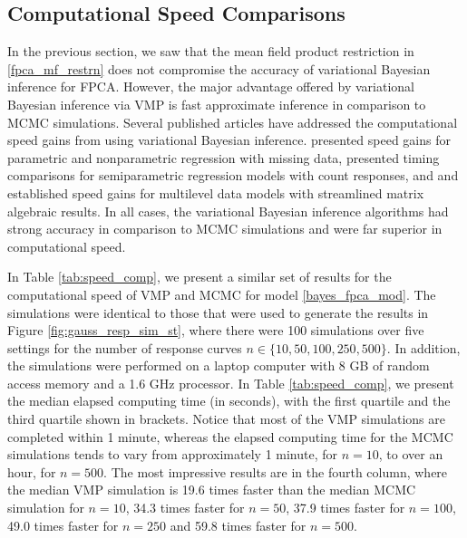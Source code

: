 \documentclass[ba]{imsart}
\numberwithin{equation}{section}
\theoremstyle{plain}
\begin{document}

\subsection{Computational Speed Comparisons}
\label{sec:speed_comp}

In the previous section, we saw that the mean field product restriction in \eqref{fpca_mf_restrn} does not
compromise the accuracy of variational Bayesian inference for FPCA. However,
the major advantage offered by variational Bayesian inference via VMP is fast approximate inference in 
comparison to MCMC simulations. Several published articles have addressed the computational speed gains
from using variational Bayesian inference. \citet{faes11} presented speed gains for parametric and nonparametric
regression with missing data, \citet{luts15} presented timing comparisons for semiparametric regression
models with count responses, and
\citet{lee16} and \citet{nolanmw20} established speed gains for multilevel data models
with streamlined matrix algebraic results.
In all cases, the variational Bayesian inference algorithms had strong accuracy in
comparison to MCMC simulations and were far superior in computational speed.

In Table \ref{tab:speed_comp}, we present a similar set of results for the computational speed of VMP and MCMC
for model \eqref{bayes_fpca_mod}. The simulations were identical to those that were used to generate the
results in Figure \ref{fig:gauss_resp_sim_st}, where there were 100 simulations over five settings for the number
of response curves $n \in \{10, 50, 100, 250, 500\}$. In addition, the simulations were performed on a laptop computer
with 8 GB of random access memory and a 1.6 GHz processor. In Table \ref{tab:speed_comp},
we present the median elapsed computing time (in seconds),
with the first quartile and the third quartile shown in brackets.
Notice that most of the VMP simulations are completed within 1 minute, whereas the elapsed computing time
for the MCMC simulations tends to vary from approximately 1 minute, for $n = 10$, to over an hour, for $n = 500$.
The most impressive results are in the fourth column, where the median VMP simulation is 19.6 times faster
than the median MCMC simulation for $n = 10$, 34.3 times faster for $n = 50$, 37.9 times faster for $n = 100$,
49.0 times faster for $n = 250$ and 59.8 times faster for $n = 500$.
\end{document}
